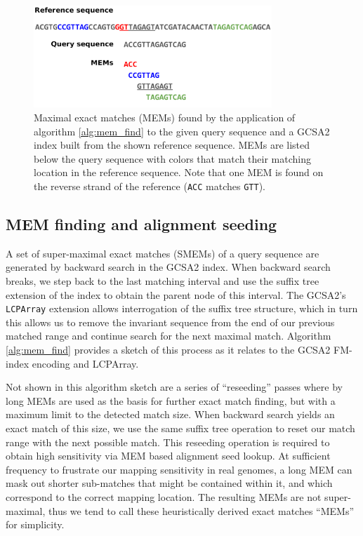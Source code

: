 \begin{figure}[htbp!]
\centering
\includegraphics[width=0.8\textwidth]{Chapter2/Figs/mem-finding.pdf}
\caption[Finding maximal exact matches (MEMs)]{
  Maximal exact matches (MEMs) found by the application of algorithm \ref{alg:mem_find} to the given query sequence and a GCSA2 index built from the shown reference sequence.
  MEMs are listed below the query sequence with colors that match their matching location in the reference sequence.
  Note that one MEM is found on the reverse strand of the reference ({\tt ACC} matches {\tt GTT}).  
}
\label{fig:mem_finding}
\end{figure}


\subsection{MEM finding and alignment seeding}
A set of super-maximal exact matches (SMEMs) of a query sequence are generated by backward search in the GCSA2 index.
When backward search breaks, we step back to the last matching interval and use the suffix tree extension of the index to obtain the parent node of this interval.
The GCSA2's {\tt LCPArray} extension allows interrogation of the suffix tree structure, which in turn this allows us to remove the invariant sequence from the end of our previous matched range and continue search for the next maximal match.
Algorithm \ref{alg:mem_find} provides a sketch of this process as it relates to the GCSA2 FM-index encoding and LCPArray.

Not shown in this algorithm sketch are a series of ``reseeding'' passes where by long MEMs are used as the basis for further exact match finding, but with a maximum limit to the detected match size.
When backward search yields an exact match of this size, we use the same suffix tree operation to reset our match range with the next possible match.
This reseeding operation is required to obtain high sensitivity via MEM based alignment seed lookup.
At sufficient frequency to frustrate our mapping sensitivity in real genomes, a long MEM can mask out shorter sub-matches that might be contained within it, and which correspond to the correct mapping location.
The resulting MEMs are not super-maximal, thus we tend to call these heuristically derived exact matches ``MEMs'' for simplicity.

